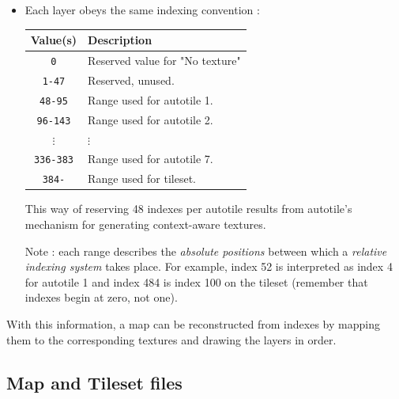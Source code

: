 \documentclass[11pt]{article}
\begin{document}
{\begin{itemize}
\begin{itemize}
		\item Intermediate : Contains mainly the textures that should be "at player's level", which includes most elements the player can interact with (including bumping into).
		
		\item Foreground : Contains mainly the textures that should be "above player's level", typically used for elements below which the player can stand.
	\end{itemize}
	
	\newpage
	\item Each layer obeys the same indexing convention :
	
	\begin{tabular}{|c|l|}
		\hline
		\rowcolor{mylightgray}
		\textbf{Value(s)} & \textbf{Description} \\
		\hline
		\verb|0| & Reserved value for "No texture" \\
		\hline
		\verb|1-47| & Reserved, unused. \\
		\hline
		\verb|48-95| & Range used for autotile 1. \\
		\hline
		\verb|96-143| & Range used for autotile 2. \\
		\hline
		$\vdots$ & \phantom{hi reader :wink:}$\vdots$ \\
		\hline
		\verb|336-383| & Range used for autotile 7. \\
		\hline
		\verb|384-| & Range used for tileset. \\
		\hline
	\end{tabular}
	
	This way of reserving 48 indexes per autotile results from autotile's mechanism for generating context-aware textures.
	
	Note : each range describes the \textit{absolute positions} between which a \textit{relative indexing system} takes place. For example, index 52 is interpreted as index 4 for autotile 1 and index 484 is index 100 on the tileset (remember that indexes begin at zero, not one).
	
\end{itemize}

With this information, a map can be reconstructed from indexes by mapping them to the corresponding textures and drawing the layers in order.




\subsection{Map and Tileset files}

}
\end{document}
